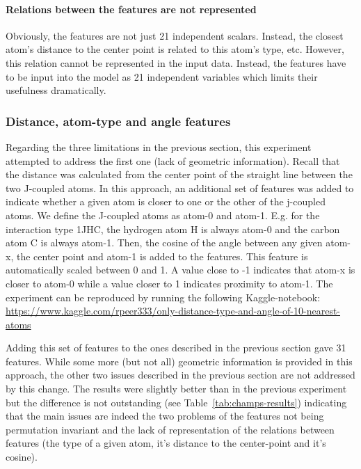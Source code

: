 \paragraph*{Relations between the features are not represented} Obviously, the features are not just 21 independent scalars. Instead, the closest atom's distance to the center point is related to this atom's type, etc. However, this relation cannot be represented in the input data. Instead, the features have to be input into the model as 21 independent variables which limits their usefulness dramatically.


\subsubsection{Distance, atom-type and angle features}
\label{sec:dist-angle-atom-type}

Regarding the three limitations in the previous section, this experiment attempted to address the first one (lack of geometric information). Recall that the distance was calculated from the center point of the straight line between the two J-coupled atoms. In this approach, an additional set of features was added to indicate whether a given atom is closer to one or the other of the j-coupled atoms. We define the J-coupled atoms as atom-0 and atom-1. E.g. for the interaction type 1JHC, the hydrogen atom H is always atom-0 and the carbon atom C is always atom-1. Then, the cosine of the angle between any given atom-x, the center point and atom-1 is added to the features. This feature is automatically scaled between 0 and 1. A value close to -1 indicates that atom-x is closer to atom-0 while a value closer to 1 indicates proximity to atom-1. The experiment can be reproduced by running the following Kaggle-notebook:~ \url{https://www.kaggle.com/rpeer333/only-distance-type-and-angle-of-10-nearest-atoms}

Adding this set of features to the ones described in the previous section gave 31 features. While some more (but not all) geometric information is provided in this approach, the other two issues described in the previous section are not addressed by this change. The results were slightly better than in the previous experiment but the difference is not outstanding (see Table~\ref{tab:champs-results}) indicating that the main issues are indeed the two problems of the features not being permutation invariant and the lack of representation of the relations between features (the type of a given atom, it's distance to the center-point and it's cosine).

